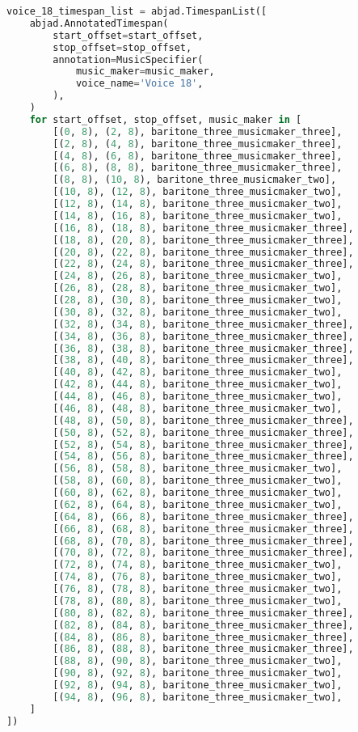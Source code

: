 \begin{lstlisting}[language=Python, caption=Invocation Source Code]
voice_18_timespan_list = abjad.TimespanList([
    abjad.AnnotatedTimespan(
        start_offset=start_offset,
        stop_offset=stop_offset,
        annotation=MusicSpecifier(
            music_maker=music_maker,
            voice_name='Voice 18',
        ),
    )
    for start_offset, stop_offset, music_maker in [
        [(0, 8), (2, 8), baritone_three_musicmaker_three],
        [(2, 8), (4, 8), baritone_three_musicmaker_three],
        [(4, 8), (6, 8), baritone_three_musicmaker_three],
        [(6, 8), (8, 8), baritone_three_musicmaker_three],
        [(8, 8), (10, 8), baritone_three_musicmaker_two],
        [(10, 8), (12, 8), baritone_three_musicmaker_two],
        [(12, 8), (14, 8), baritone_three_musicmaker_two],
        [(14, 8), (16, 8), baritone_three_musicmaker_two],
        [(16, 8), (18, 8), baritone_three_musicmaker_three],
        [(18, 8), (20, 8), baritone_three_musicmaker_three],
        [(20, 8), (22, 8), baritone_three_musicmaker_three],
        [(22, 8), (24, 8), baritone_three_musicmaker_three],
        [(24, 8), (26, 8), baritone_three_musicmaker_two],
        [(26, 8), (28, 8), baritone_three_musicmaker_two],
        [(28, 8), (30, 8), baritone_three_musicmaker_two],
        [(30, 8), (32, 8), baritone_three_musicmaker_two],
        [(32, 8), (34, 8), baritone_three_musicmaker_three],
        [(34, 8), (36, 8), baritone_three_musicmaker_three],
        [(36, 8), (38, 8), baritone_three_musicmaker_three],
        [(38, 8), (40, 8), baritone_three_musicmaker_three],
        [(40, 8), (42, 8), baritone_three_musicmaker_two],
        [(42, 8), (44, 8), baritone_three_musicmaker_two],
        [(44, 8), (46, 8), baritone_three_musicmaker_two],
        [(46, 8), (48, 8), baritone_three_musicmaker_two],
        [(48, 8), (50, 8), baritone_three_musicmaker_three],
        [(50, 8), (52, 8), baritone_three_musicmaker_three],
        [(52, 8), (54, 8), baritone_three_musicmaker_three],
        [(54, 8), (56, 8), baritone_three_musicmaker_three],
        [(56, 8), (58, 8), baritone_three_musicmaker_two],
        [(58, 8), (60, 8), baritone_three_musicmaker_two],
        [(60, 8), (62, 8), baritone_three_musicmaker_two],
        [(62, 8), (64, 8), baritone_three_musicmaker_two],
        [(64, 8), (66, 8), baritone_three_musicmaker_three],
        [(66, 8), (68, 8), baritone_three_musicmaker_three],
        [(68, 8), (70, 8), baritone_three_musicmaker_three],
        [(70, 8), (72, 8), baritone_three_musicmaker_three],
        [(72, 8), (74, 8), baritone_three_musicmaker_two],
        [(74, 8), (76, 8), baritone_three_musicmaker_two],
        [(76, 8), (78, 8), baritone_three_musicmaker_two],
        [(78, 8), (80, 8), baritone_three_musicmaker_two],
        [(80, 8), (82, 8), baritone_three_musicmaker_three],
        [(82, 8), (84, 8), baritone_three_musicmaker_three],
        [(84, 8), (86, 8), baritone_three_musicmaker_three],
        [(86, 8), (88, 8), baritone_three_musicmaker_three],
        [(88, 8), (90, 8), baritone_three_musicmaker_two],
        [(90, 8), (92, 8), baritone_three_musicmaker_two],
        [(92, 8), (94, 8), baritone_three_musicmaker_two],
        [(94, 8), (96, 8), baritone_three_musicmaker_two],
    ]
])


\end{lstlisting}
